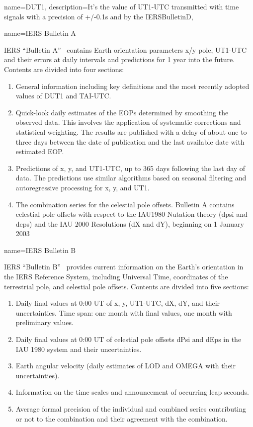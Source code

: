  {
	name={DUT1},
	description={It's the value of \gls{UT1}-\gls{UTC} transmitted with time signals with a precision of +/-0.1s and by the \gls{IERSBulletinD}},
}


	{name=IERS Bulletin A}
	{\gls{IERS} ``Bulletin A''~\cite{iersBULLETINAProductMetadata} contains Earth orientation parameters x/y pole, UT1-UTC and their errors at daily intervals and predictions for 1 year into the future. Contents are divided into four sections:
	\begin{enumerate}  
		\item General information including key definitions and the most recently adopted values of DUT1 and TAI-UTC.
		\item Quick-look daily estimates of the EOPs determined by smoothing the observed data. This involves the application of systematic corrections and statistical weighting. The results are published with a delay of about one to three days between the date of publication and the last available date with estimated EOP. 
		\item Predictions of x, y, and UT1-UTC, up to 365 days following the last day of data. The predictions use similar algorithms based on seasonal filtering and autoregressive processing for x, y, and UT1.
		\item The combination series for the celestial pole offsets. Bulletin A contains celestial pole offsets with respect to the IAU1980 Nutation theory (dpsi and deps) and the IAU 2000 Resolutions (dX and dY), beginning on 1 January 2003
	\end{enumerate}	}

{name=IERS Bulletin B}
{\gls{IERS} ``Bulletin B''~\cite{iersBULLETINBProductMetadata} provides current information on the Earth's orientation in the IERS Reference System, including Universal Time, coordinates of the terrestrial pole, and celestial pole offsets. Contents are divided into five sections:
	\begin{enumerate}  
		\item Daily final values at 0:00 UT of x, y, UT1-UTC, dX, dY, and their uncertainties. Time span: one month with final values, one month with preliminary values.
		\item Daily final values at 0:00 UT of celestial pole offsets dPsi and dEps in the IAU 1980 system and their uncertainties.
		\item Earth angular velocity (daily estimates of LOD and OMEGA with their uncertainties).
		\item Information on the time scales and announcement of occurring leap seconds.
		\item Average formal precision of the individual and combined series contributing or not to the combination and their agreement with the combination.
	\end{enumerate}	
}

